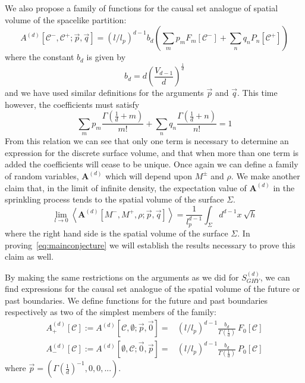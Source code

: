 \documentclass[12pt]{article}
\newcommand{\be}{\begin{equation}}
\newcommand{\ee}{\end{equation}}
\newcommand{\F}[1]{F_{#1}}
\renewcommand{\P}[1]{P_{#1}}
\begin{document}
We also propose a family of functions for the causal set analogue of spatial volume of the spacelike partition:
\be\label{general_area_sum}
A^{ (d)}[\mathcal{C}^-,\mathcal{C}^+;\vec{p},\vec{q}]=\left (l/l_p\right)^{d-1}b_{d}\left (\sum_m p_m \F{m}\left[\mathcal{C}^- \right] + \sum_n q_n \P{n}\left[\mathcal{C}^+ \right]\right)
\ee
where the constant $b_d$ is given by
\be\label{constant_b_d}
b_d=d\left(\frac{V_{d-1}}{d}\right)^{\frac{1}{d}}
\ee
and we have used similar definitions for the arguments $\vec{p}$ and $\vec{q}$. This time however, the coefficients must satisfy 
\be\label{area_coefficient_relation}
\sum_m p_m \frac{\Gamma\left (\frac{1}{d}+m \right)}{m!}  + \sum_n q_n\frac{\Gamma\left (\frac{1}{d}+n \right)}{n!}=1
\ee
From this relation we can see that only one term is necessary to determine an expression for the discrete surface volume, and that when more than one term is added the coefficients will cease to be unique. Once again we can define a family of random variables, $\textbf{A}^{ (d)}$ which will depend upon $M^{\pm}$ and $\rho$. We make another claim that, in the limit of infinite density, the expectation value of $\textbf{A}^{ (d)}$ in the sprinkling process tends to the spatial volume of the surface $\Sigma$.
\be\label{eq:conjecture_for_area}
\lim_{l\rightarrow0}\left\langle\textbf{A}^{ (d)}[M^-,M^+,\rho;\vec{p} , \vec{q}]\right\rangle= \frac{1}{l_p^{d-1}}\int_{\Sigma} d^{d-1}x\: \sqrt{h}
\ee
where the right hand side is the spatial volume of the surface $\Sigma$. In proving~\eqref{eq:mainconjecture} we will establish the results necessary to prove this claim as well.

By making the same restrictions on the arguments as we did for $S^{ (d)}_{GHY}$, we can find expressions for the causal set analogue of the spatial volume of the future or past boundaries. We define functions for the future and past boundaries respectively as two of the simplest members of the family:
\begin{align}\label{eq:future_past_spatial_volume}
A^{ (d)}_{+}[\mathcal{C}]:=A^{ (d)}[\mathcal{C},\emptyset;\vec{p},\vec{0}]= & \left (l/l_p\right)^{d-1}\frac{b_{d}}{\Gamma\left (\frac{1}{d}\right)}\: \F{0}[\mathcal{C}]
\\
A^{ (d)}_{-}[\mathcal{C}]:=A^{ (d)}[\emptyset,\mathcal{C};\vec{0},\vec{p}]= & \left (l/l_p\right)^{d-1}\frac{b_{d}}{\Gamma\left (\frac{1}{d}\right)}\: \P{0}[\mathcal{C}]
\end{align}
where $\vec{p}= (\Gamma\left (\frac{1}{d}\right)^{-1},0,0,...)$.
\end{document}
